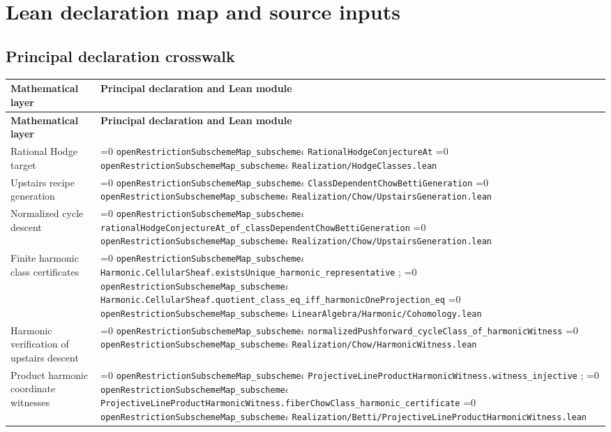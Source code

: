 \documentclass[11pt]{article}
\theoremstyle{definition}
\theoremstyle{remark}
\newcommand{\leanpath}[1]{%
  \ifnum\pdfstrcmp{\detokenize{#1}}%
      {\detokenize{openRestrictionSubschemeMap_subschemeι}}=0
    \texttt{\nolinkurl{openRestrictionSubschemeMap_subscheme}}\ensuremath{\iota}%
  \else
    \texttt{\nolinkurl{#1}}%
  \fi}
\begin{document}
\clearpage
\section{Lean declaration map and source inputs}
\label{sec:lean-map}
\label{app:lean-map}

\subsection{Principal declaration crosswalk}

\renewcommand{\arraystretch}{1.2}
\begingroup
\small
\begin{longtable}{@{}>{\raggedright\arraybackslash}p{}
                >{\raggedright\arraybackslash}p{}@{}}
\textbf{Mathematical layer} & \textbf{Principal declaration and Lean module}\\ \hline
\endfirsthead
\textbf{Mathematical layer} & \textbf{Principal declaration and Lean module}\\ \hline
\endhead
Rational Hodge target &
\leanpath{RationalHodgeConjectureAt}\newline
\leanpath{Realization/HodgeClasses.lean}\\
Upstairs recipe generation &
\leanpath{ClassDependentChowBettiGeneration}\newline
\leanpath{Realization/Chow/UpstairsGeneration.lean}\\
Normalized cycle descent &
\leanpath{rationalHodgeConjectureAt_of_classDependentChowBettiGeneration}\newline
\leanpath{Realization/Chow/UpstairsGeneration.lean}\\
Finite harmonic class certificates &
\leanpath{Harmonic.CellularSheaf.existsUnique_harmonic_representative};
\leanpath{Harmonic.CellularSheaf.quotient_class_eq_iff_harmonicOneProjection_eq}\newline
\leanpath{LinearAlgebra/Harmonic/Cohomology.lean}\\
Harmonic verification of upstairs descent &
\leanpath{normalizedPushforward_cycleClass_of_harmonicWitness}\newline
\leanpath{Realization/Chow/HarmonicWitness.lean}\\
Product harmonic coordinate witnesses &
\leanpath{ProjectiveLineProductHarmonicWitness.witness_injective};
\leanpath{ProjectiveLineProductHarmonicWitness.fiberChowClass_harmonic_certificate}\newline
\leanpath{Realization/Betti/ProjectiveLineProductHarmonicWitness.lean}\\

\end{longtable}
\end{document}
